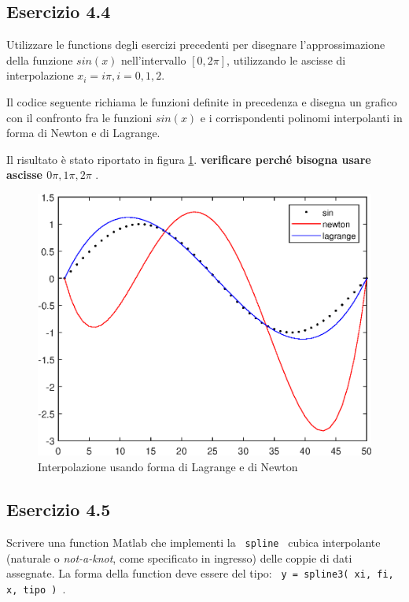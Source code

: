 	\subsection {Esercizio 4.4}
Utilizzare le functions degli esercizi precedenti per disegnare l'approssimazione della funzione $sin(x)$  nell'intervallo $[0, 2\pi]$, utilizzando le ascisse di interpolazione $x_{i}=i\pi, i=0,1,2$.

Il codice seguente richiama le funzioni definite in precedenza e disegna un grafico con il confronto fra le funzioni $sin(x)$ e i corrispondenti polinomi interpolanti in forma di Newton e di Lagrange.

Il risultato è stato riportato in figura \ref{sin_interpolation}. \textbf{ verificare perché bisogna usare ascisse $0\pi, 1\pi, 2\pi$ }.

\begin{figure}\label{sin_interpolation}
    \centering
    \includegraphics{./capitolo_4/sin_interpolation}
    \caption{Interpolazione usando forma di Lagrange e di Newton}
\end{figure} 

	\subsection {Esercizio 4.5}
Scrivere una function Matlab che implementi la \texttt { spline } cubica interpolante (naturale o \textit{not-a-knot}, come specificato in ingresso) delle coppie di dati assegnate. La forma della function deve essere del tipo: \texttt { y = spline3( xi, fi, x, tipo ) }.

